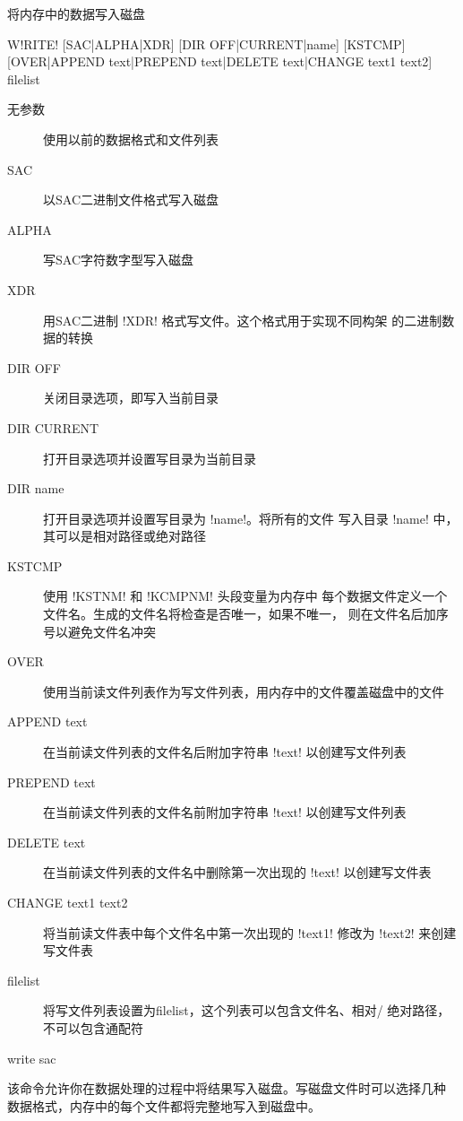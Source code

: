 \label{cmd:write}

将内存中的数据写入磁盘

\begin{SACSTX}
W!RITE! [SAC|ALPHA|XDR] [DIR OFF|CURRENT|name] [KSTCMP]
    [OVER|APPEND text|PREPEND text|DELETE text|CHANGE text1 text2] filelist
\end{SACSTX}

\begin{description}
\item [无参数] 使用以前的数据格式和文件列表
\item [SAC] 以SAC二进制文件格式写入磁盘
\item [ALPHA] 写SAC字符数字型写入磁盘
\item [XDR] 用SAC二进制 !XDR! 格式写文件。这个格式用于实现不同构架
    的二进制数据的转换
\item [DIR OFF] 关闭目录选项，即写入当前目录
\item [DIR CURRENT] 打开目录选项并设置写目录为当前目录
\item [DIR name] 打开目录选项并设置写目录为 !name!。将所有的文件
    写入目录 !name! 中，其可以是相对路径或绝对路径
\item [KSTCMP] 使用 !KSTNM! 和 !KCMPNM! 头段变量为内存中
    每个数据文件定义一个文件名。生成的文件名将检查是否唯一，如果不唯一，
    则在文件名后加序号以避免文件名冲突
\item [OVER] 使用当前读文件列表作为写文件列表，用内存中的文件覆盖磁盘中的文件
\item [APPEND text] 在当前读文件列表的文件名后附加字符串 !text!
    以创建写文件列表
\item [PREPEND text] 在当前读文件列表的文件名前附加字符串 !text!
    以创建写文件列表
\item [DELETE text] 在当前读文件列表的文件名中删除第一次出现的 !text!
    以创建写文件表
\item [CHANGE text1 text2] 将当前读文件表中每个文件名中第一次出现的 !text1!
    修改为 !text2! 来创建写文件表
\item [filelist] 将写文件列表设置为filelist，这个列表可以包含文件名、相对/
    绝对路径，不可以包含通配符
\end{description}

\begin{SACDFT}
write sac
\end{SACDFT}

该命令允许你在数据处理的过程中将结果写入磁盘。写磁盘文件时可以选择几种
数据格式，内存中的每个文件都将完整地写入到磁盘中。

